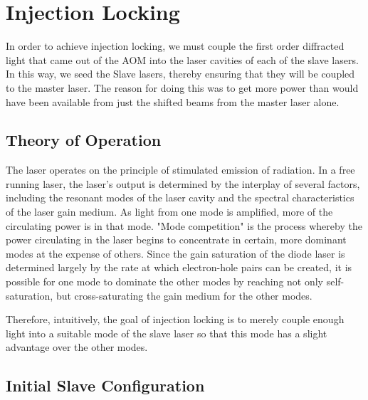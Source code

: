  \chapter{Injection Locking}\label{InjectionLockingChapter}


In order to achieve injection locking, we must couple the first order diffracted light that came out of the AOM into the laser cavities of each of the slave lasers. In this way, we seed the Slave lasers, thereby ensuring that they will be coupled to the master laser. 
The reason for doing this was to get more power than would have been available from just the shifted beams from the master laser alone. 

\section{Theory of Operation}


The laser operates on the principle of stimulated emission of radiation. In a free running laser, the laser's output is determined by the interplay of several factors, including the resonant modes of the laser cavity and the spectral characteristics of the laser gain medium. As light from one mode is amplified, more of the circulating power is in that mode. 
"Mode competition" is the process whereby the power circulating in the laser begins to concentrate in certain, more dominant modes at the expense of others. Since the gain saturation of the diode laser is determined largely by the rate at which electron-hole pairs can be created, it is possible for one mode to dominate the other modes by reaching not only self-saturation, but cross-saturating the gain medium for the other modes\cite{RPPhotonicsEncyclopediaAndBuyersGuide}.

Therefore, intuitively, the goal of injection locking is to merely couple enough light into a suitable mode of the slave laser so that this mode has a slight advantage over the other modes. 

\section{Initial Slave Configuration}
\label{initialSlaveConfiguration}


